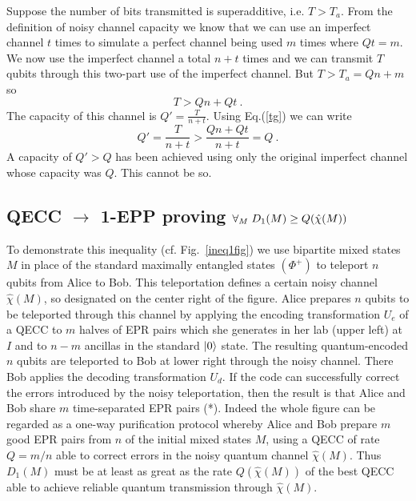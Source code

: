 Suppose the number of bits transmitted is superadditive, i.e. $T>T_a$.  
From the definition of noisy channel capacity we know that we can 
use an imperfect channel $t$ times to simulate
a perfect channel being used $m$ times where $Qt=m$.
We now use the imperfect channel a total $n+t$ 
times and we can transmit $T$ qubits through this two-part
use of the imperfect channel.  But $T>T_a=Qn+m$ so 
\begin{equation}
T>Qn+Qt\ . 
\label{tg}
\end{equation}
The capacity of this channel is $Q'=\frac{T}{n+t}$.  Using Eq.(\ref{tg})
we can write
\begin{equation}
Q'=\frac{T}{n+t} > \frac{Qn+Qt}{n+t}=Q\ . 
\end{equation}
A capacity of $Q'> Q$ has been achieved using only the original
imperfect channel whose capacity was $Q$.  This cannot be so.


\subsection{QECC $\rightarrow$ 1-EPP proving
$\boldmath{\forall_M \; D_1(M) \geq Q(\hat{\chi}(M))}$}

\label{ineq1} 
 
To demonstrate this inequality (cf. Fig.~\ref{ineq1fig}) we use
bipartite mixed states
$M$ in place of the standard maximally entangled states
$(\Phi^+)$ to teleport $n$ qubits from Alice to Bob.  This teleportation
defines a certain noisy channel $\hat{\chi}(M)$, so designated
on the center right of the figure. Alice
prepares $n$ qubits to be teleported through this channel by applying the
encoding transformation
$U_e$ of a QECC to $m$ halves of EPR pairs which she generates in her lab
(upper left) at $I$ and to
$n-m$ ancillas in the standard $| 0 \rangle$ state.  The resulting quantum-encoded
$n$ qubits are teleported to Bob at lower right through the noisy channel.
There Bob applies the decoding transformation $U_d$.  If the code can
successfully correct the errors introduced by the noisy teleportation,
then the result is that Alice and Bob share $m$ time-separated EPR pairs
(*).  Indeed the whole figure can be regarded as a one-way
purification protocol whereby Alice and Bob prepare $m$ good EPR pairs from $n$
of the initial mixed states $M$, using a QECC of rate $Q=m/n$ able to correct
errors in the noisy quantum channel $\hat{\chi}(M)$.  Thus $D_1(M)$ must be
at least as great as the rate $Q(\hat{\chi}(M))$ of the best QECC able
to achieve reliable quantum transmission through $\hat{\chi}(M)$.
 
